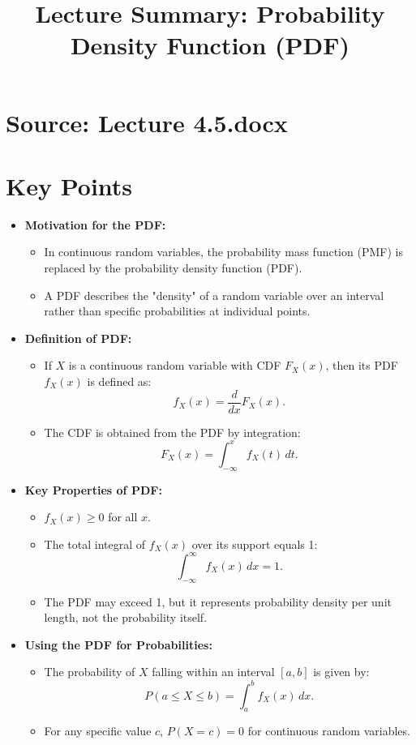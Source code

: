 \documentclass{article}
\title{Lecture Summary: Probability Density Function (PDF)}
\author{}
\date{}
\begin{document}
\maketitle

\section*{Source: Lecture 4.5.docx}

\section*{Key Points}

\begin{itemize}
  \item \textbf{Motivation for the PDF:}
    \begin{itemize}
      \item In continuous random variables, the probability mass function (PMF) is replaced by the probability density function (PDF).
      \item A PDF describes the "density" of a random variable over an interval rather than specific probabilities at individual points.
    \end{itemize}

  \item \textbf{Definition of PDF:}
    \begin{itemize}
      \item If $X$ is a continuous random variable with CDF $F_X(x)$, then its PDF $f_X(x)$ is defined as:
        \[
          f_X(x) = \frac{d}{dx}F_X(x).
        \]
      \item The CDF is obtained from the PDF by integration:
        \[
          F_X(x) = \int_{-\infty}^x f_X(t) \, dt.
        \]
    \end{itemize}

  \item \textbf{Key Properties of PDF:}
    \begin{itemize}
      \item $f_X(x) \geq 0$ for all $x$.
      \item The total integral of $f_X(x)$ over its support equals 1:
        \[
          \int_{-\infty}^\infty f_X(x) \, dx = 1.
        \]
      \item The PDF may exceed 1, but it represents probability density per unit length, not the probability itself.
    \end{itemize}

  \item \textbf{Using the PDF for Probabilities:}
    \begin{itemize}
      \item The probability of $X$ falling within an interval $[a, b]$ is given by:
        \[
          P(a \leq X \leq b) = \int_a^b f_X(x) \, dx.
        \]
      \item For any specific value $c$, $P(X = c) = 0$ for continuous random variables.
    \end{itemize}


\end{itemize}
\end{document}
